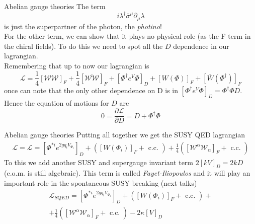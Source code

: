 \documentclass[10pt]{beamer}
\begin{document}
\begin{frame}{Abelian gauge theories}
The term 
\begin{equation*}
    i\lambda^{\dagger} \bar\sigma^{\mu}\partial_{\mu} \lambda
\end{equation*}
is just the superpartner of the photon, the \emph{photino}! \\
For the other term, we can show that it plays no physical role (as the F term in the chiral fields). To do this we need to spot all the $D$ dependence in our lagrangian. \\
Remembering that up to now our lagrangian is 
\begin{equation*}
    \mathcal{L} = \frac{1}{4}\left[\mathcal{WW}\right]_F + \frac{1}{4} \left[\overline{\mathcal{WW}}\right]_F + \left[\Phi^{\dagger} e^V \Phi\right]_D + [W(\Phi)]_F + [\bar W(\Phi^{\dagger})]_F
\end{equation*}
once can note that the only other dependence on D is in $\left[\Phi^{\dagger} e^V \Phi \right]_D = \Phi^{\dagger}\Phi D$.
Hence the equation of motions for $D$ are
\begin{equation*}
    0 = \frac{\partial \mathcal{L}}{\partial D} = D + \Phi^{\dagger} \Phi 
\end{equation*}
\end{frame}

\begin{frame}{Abelian gauge theories}
Putting all together we get the SUSY QED lagrangian 
\begin{gather*}
    \mathcal{L} = \mathcal{L}=\left[\Phi^{* i} e^{2 g q_{i} V_{\Phi_{i}}}\right]_{D}+\left(\left[W\left(\Phi_{i}\right)\right]_{F}+\text { c.c. }\right)+\frac{1}{4}\left(\left[\mathcal{W}^{\alpha} \mathcal{W}_{\alpha}\right]_{F}+\text { c.c. }\right)
\end{gather*}
To this we add another SUSY and supergauge invariant term $2[kV]_D = 2kD$ (e.o.m. is still algebraic). 
This term is called \emph{Fayet-Iliopoulos} and it will play an important role in the spontaneous SUSY breaking (next talks)
\begin{equation*}
    \boxed{
        \begin{gathered}
        \mathcal{L}_{SQED} = \left[\Phi^{* i} e^{2 g q_{i} V_{\Phi_{i}}}\right]_{D}+\left(\left[W\left(\Phi_{i}\right)\right]_{F}+\text { c.c. }\right)+ \\ 
        +\frac{1}{4}\left(\left[\mathcal{W}^{\alpha} \mathcal{W}_{\alpha}\right]_{F}+\text { c.c. }\right)-2 \kappa[V]_{D}
        \end{gathered}}
\end{equation*}
\end{frame}
\end{document}
